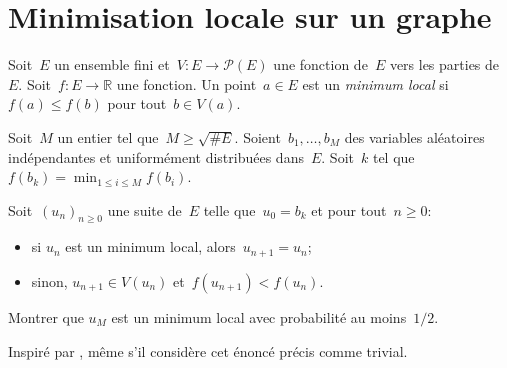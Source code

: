 \section{Minimisation locale sur un graphe}

Soit~$E$ un ensemble fini et~$V : E \to \mathcal{P}(E)$ une fonction de~$E$ vers les parties de~$E$.
Soit~$f : E \to \mathbb{R}$ une fonction.
Un point~$a \in E$ est un \emph{minimum local} si
$f(a) \leq f(b)$ pour tout~$b \in V(a)$.

Soit~$M$ un entier tel que~$M \geq \sqrt{\# E}$. Soient~$b_1,\dotsc,b_M$ des variables aléatoires indépendantes et uniformément distribuées dans~$E$.
Soit~$k$ tel que $f(b_k) = \min_{1\leq i \leq M} f(b_i)$.

Soit~$(u_n)_{n\geq 0}$ une suite de~$E$ telle que~$u_0 = b_k$
et pour tout~$n \geq 0$:
\begin{itemize}
  \item si $u_n$ est un minimum local, alors~$u_{n+1} = u_n$;
  \item sinon, $u_{n+1} \in V(u_n)$ et~$f(u_{n+1}) < f(u_n)$.
\end{itemize}

Montrer que $u_{M}$ est un minimum local avec probabilité au moins~$1/2$.

\begin{em}
  Inspiré par \textcite{Aldous_1983}, même s'il considère cet énoncé précis comme trivial.
\end{em}

